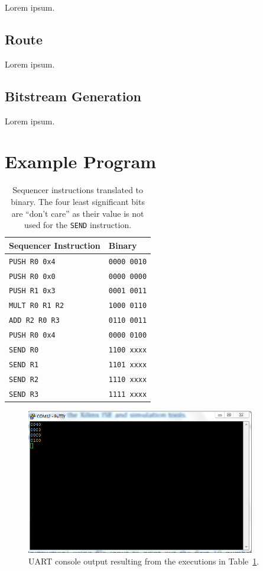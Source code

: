 \documentclass[]{article}
\begin{document}
Lorem ipsum.

\subsection{Route}

Lorem ipsum.

\subsection{Bitstream Generation}

Lorem ipsum.

\section{Example Program}

\begin{table}[H]
\centering
\begin{tabular}{ l | l }
\textbf{Sequencer Instruction} & \textbf{Binary}\\\hline
\texttt{PUSH R0 0x4} & \texttt{0000 0010}\\
\texttt{PUSH R0 0x0} & \texttt{0000 0000}\\
\texttt{PUSH R1 0x3} & \texttt{0001 0011}\\
\texttt{MULT R0 R1 R2} & \texttt{1000 0110}\\
\texttt{ADD R2 R0 R3} & \texttt{0110 0011}\\
\texttt{PUSH R0 0x4} & \texttt{0000 0100}\\
\texttt{SEND R0} & \texttt{1100  xxxx}\\
\texttt{SEND R1} & \texttt{1101  xxxx}\\
\texttt{SEND R2} & \texttt{1110  xxxx}\\
\texttt{SEND R3} & \texttt{1111  xxxx}\\
\end{tabular}
\caption{Sequencer instructions translated to binary. The four least significant bits are ``don't care'' as their value is not used for the \texttt{SEND} instruction.}
\label{table:translation}
\end{table}

\begin{figure}[H]
\centering
\includegraphics[width=10cm]{translation.png}
\caption{UART console output resulting from the executions in Table~\ref{table:translation}.}
\end{figure}
\end{document}
